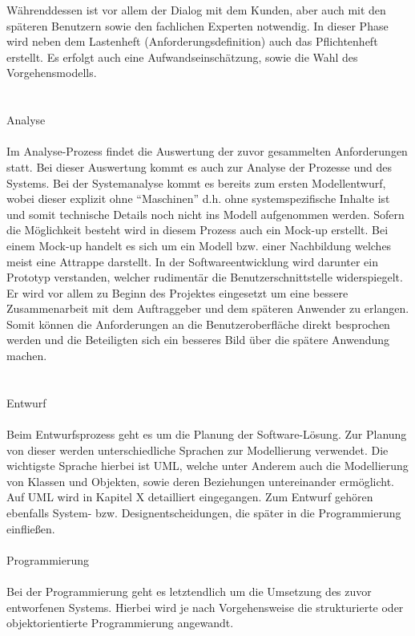 Währenddessen ist vor allem der Dialog mit dem Kunden, aber auch mit den späteren Benutzern sowie den fachlichen Experten notwendig.
In dieser Phase wird neben dem Lastenheft (Anforderungsdefinition) auch das Pflichtenheft erstellt. Es erfolgt auch eine Aufwandseinschätzung, sowie die Wahl des Vorgehensmodells.\\
\\
\\
Analyse\\
\\
Im Analyse-Prozess findet die Auswertung der zuvor gesammelten Anforderungen statt. Bei dieser Auswertung kommt es auch zur Analyse der Prozesse und des Systems. Bei der Systemanalyse kommt es bereits zum ersten Modellentwurf, wobei dieser explizit ohne “Maschinen” d.h. ohne systemspezifische Inhalte ist und somit technische Details noch nicht ins Modell aufgenommen werden. Sofern die Möglichkeit besteht wird in diesem Prozess auch ein Mock-up erstellt. Bei einem Mock-up handelt es sich um ein Modell bzw. einer Nachbildung welches meist eine Attrappe darstellt. In der Softwareentwicklung wird darunter ein Prototyp verstanden, welcher rudimentär die Benutzerschnittstelle widerspiegelt. Er wird vor allem zu Beginn des Projektes eingesetzt um eine bessere Zusammenarbeit mit dem Auftraggeber und dem späteren Anwender zu erlangen. Somit können die Anforderungen an die Benutzeroberfläche direkt besprochen werden und die Beteiligten sich ein besseres Bild über die spätere Anwendung machen.\\
\\
\\
Entwurf\\
\\
Beim Entwurfsprozess geht es um die Planung der Software-Lösung. Zur Planung von dieser werden unterschiedliche Sprachen zur Modellierung verwendet. Die wichtigste Sprache hierbei ist UML, welche unter Anderem auch die Modellierung von Klassen und Objekten, sowie deren Beziehungen untereinander ermöglicht. Auf UML wird in Kapitel X detailliert eingegangen.
Zum Entwurf gehören ebenfalls System- bzw. Designentscheidungen, die später in die Programmierung einfließen.
\\
\\
Programmierung\\
\\
Bei der Programmierung geht es letztendlich um die Umsetzung des zuvor entworfenen Systems. Hierbei wird je nach Vorgehensweise die strukturierte oder objektorientierte Programmierung angewandt.
